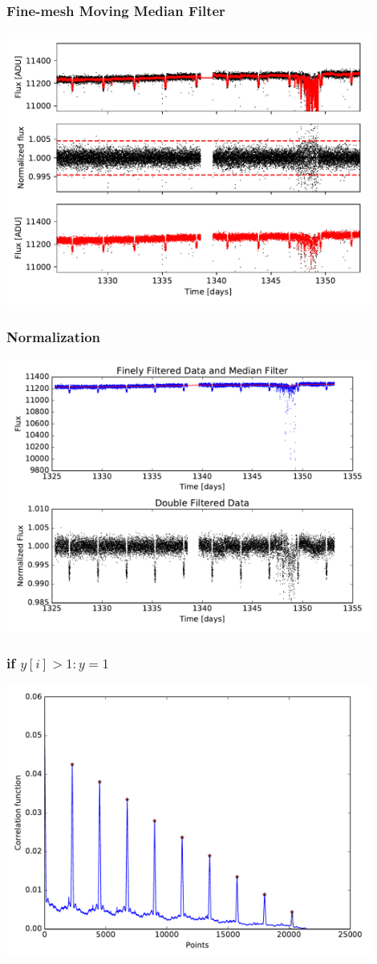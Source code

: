 \documentclass[notes]{beamer}
\begin{document}
\begin{frame}
\frametitle{Fine-mesh Moving Median Filter}
\centering
\includegraphics[width=0.9\textwidth]{../figures/2019-1-15_11:5:15_finemesh_TIC38846515.pdf}
\end{frame}

\begin{frame}
\frametitle{Normalization}
\centering
\includegraphics[width=0.9\textwidth]{../figures/2019-1-15_16:2:14_normcurve_lightcurve_TIC38846515.pdf}
\end{frame}

\begin{frame}
\frametitle{if $y[i]>1: y=1$}
\centering
\includegraphics[width=0.9\textwidth]{../figures/2018-11-27_14:45:48_peaks_fig0.pdf}
\end{frame}
\end{document}
